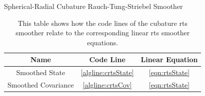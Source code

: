 		\begin{algorithm}  \DontPrintSemicolon
			\caption{Spherical-Radial Cubature Rauch-Tung-Striebel Smoother}
			\label{alg:cubatureRtsSmoother}
		\end{algorithm}
		\begin{table}
			\centering
			\begin{tabular}{c|c|c}
				   \textbf{Name}    &   \textbf{Code Line}    & \textbf{Linear Equation} \\ \hline
				  Smoothed State    & \ref{algline:crtsState} &   \eqref{eqn:rtsState}   \\
				Smoothed Covariance &  \ref{algline:crtsCov}  &   \eqref{eqn:rtsState}
			\end{tabular}
			\caption{This table shows how the code lines of the cubature \ac{rts} smoother relate to the corresponding linear \ac{rts} smoother equations.}
			\label{tab:cubatureRtsSmoother}
		\end{table}

